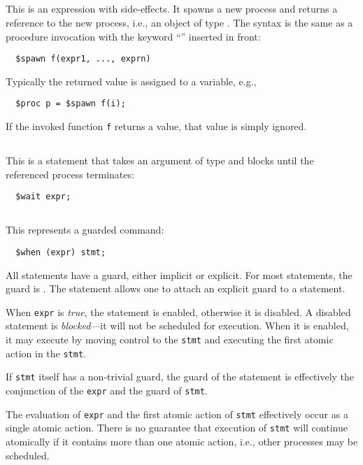 \subsection{\cspawn} This is an expression with side-effects.  It
spawns a new process and returns a reference to the new process, i.e.,
an object of type \cproc.  The syntax is the same as a procedure
invocation with the keyword ``\cspawn'' inserted in front:
\begin{verbatim}
  $spawn f(expr1, ..., exprn)
\end{verbatim}
Typically the returned value is assigned to a variable, e.g.,
\begin{verbatim}
  $proc p = $spawn f(i);
\end{verbatim}
If the invoked function \texttt{f} returns a value, that value is
simply ignored.

\subsection{\cwait} This is a statement that takes an argument of type
\cproc{} and blocks until the referenced process terminates:
\begin{verbatim}
  $wait expr;
\end{verbatim}

\subsection{\cwhen} This represents a guarded command:
\begin{verbatim}
  $when (expr) stmt;
\end{verbatim}
All statements have a guard, either implicit or explicit.  For most
statements, the guard is \ctrue.  The \cwhen{} statement allows one to
attach an explicit guard to a statement.

When \texttt{expr} is \emph{true}, the statement is enabled, otherwise
it is disabled.  A disabled statement is \emph{blocked}---it will not
be scheduled for execution.  When it is enabled, it may execute by
moving control to the \texttt{stmt} and executing the first atomic
action in the \texttt{stmt}.

If \texttt{stmt} itself has a non-trivial guard, the guard of the
\cwhen{} statement is effectively the conjunction of the \texttt{expr}
and the guard of \texttt{stmt}.

The evaluation of \texttt{expr} and the first atomic action of
\texttt{stmt} effectively occur as a single atomic action.  There is
no guarantee that execution of \texttt{stmt} will continue atomically
if it contains more than one atomic action, i.e., other processes may
be scheduled.

